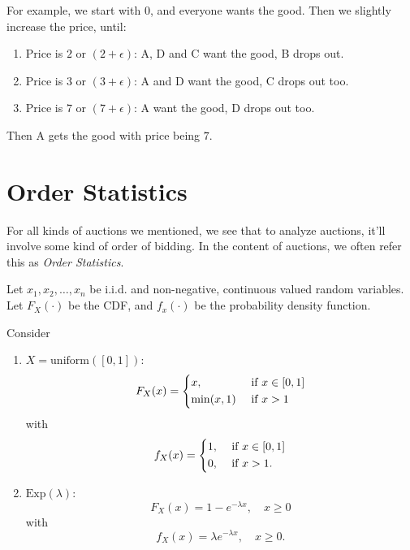\begin{eg}
\begin{enumerate}
			\begin{eg}
				For example, we start with \(0\), and everyone wants the good. Then we slightly increase the price, until:
				\begin{enumerate}
					\item Price is \(2\) or \((2+\epsilon)\):
					      A, D and C want the good, B drops out.
					\item Price is \(3\) or \((3+\epsilon)\):
					      A and D want the good, C drops out too.
					\item Price is \(7\) or \((7+\epsilon)\):
					      A want the good, D drops out too.
				\end{enumerate}
				Then A gets the good with price being \(7\).
			\end{eg}
	\end{enumerate}
\end{eg}

\section{Order Statistics}
For all kinds of auctions we mentioned, we see that to analyze auctions, it'll involve some kind of order of bidding. In the content of auctions, we often refer
this as \emph{Order Statistics}.

Let \(x_1, x_2, \ldots , x_n\) be i.i.d. and non-negative, continuous valued random variables. Let
\(F_{X}(\cdot)\) be the CDF, and \(f_{x}(\cdot)\) be the probability density function.
\begin{eg}
	Consider
	\begin{enumerate}
		\item \(X = \mathrm{uniform}([0, 1])\):
		      \[
			      F_X(x) = \begin{dcases}
				      x,         & \text{ if } x\in[0, 1] \\
				      \min(x, 1) & \text{ if }x>1         \\
			      \end{dcases}
		      \]
		      with
		      \[
			      f_X(x) = \begin{dcases}
				      1, & \text{ if } x\in[0, 1] \\
				      0, & \text{ if }x>1.
			      \end{dcases}
		      \]
		\item \(\mathrm{Exp}(\lambda)\):
		      \[
			      F_X(x) = 1 - e^{-\lambda x}, \quad x\geq 0
		      \]
		      with
		      \[
			      f_X(x) = \lambda e^{-\lambda x},\quad x\geq 0.
		      \]
	\end{enumerate}
\end{eg}


